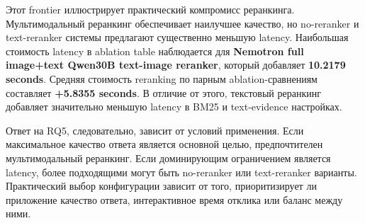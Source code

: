 \documentclass[conference]{IEEEtran}
\begin{document}
\begin{table}[t]
\caption{Таблица 8}
\centering
\scriptsize
{}
\end{table}

Этот frontier иллюстрирует практический компромисс реранкинга. Мультимодальный реранкинг обеспечивает наилучшее качество, но no-reranker и text-reranker системы предлагают существенно меньшую latency. Наибольшая стоимость latency в ablation table наблюдается для \textbf{Nemotron full image+text Qwen30B text-image reranker}, который добавляет \textbf{10.2179 seconds}. Средняя стоимость reranking по парным ablation-сравнениям составляет \textbf{+5.8355 seconds}. В отличие от этого, текстовый реранкинг добавляет значительно меньшую latency в BM25 и text-evidence настройках.

Ответ на RQ5, следовательно, зависит от условий применения. Если максимальное качество ответа является основной целью, предпочтителен мультимодальный реранкинг. Если доминирующим ограничением является latency, более подходящими могут быть no-reranker или text-reranker варианты. Практический выбор конфигурации зависит от того, приоритизирует ли приложение качество ответа, интерактивное время отклика или баланс между ними.
\end{document}
